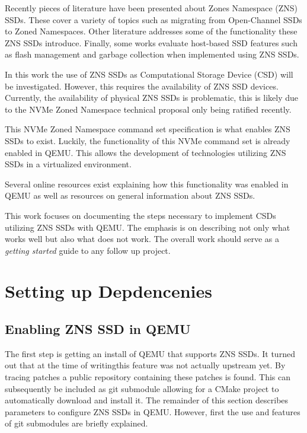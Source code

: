 \documentclass[conference]{IEEEtran}
\begin{document}
Recently pieces of literature have been presented about Zones Namespace (ZNS)
SSDs. These cover a variety of topics such as migrating from Open-Channel
SSDs to Zoned Namespaces\cite{bjorling2019open}. Other literature addresses
some of the  functionality these ZNS SSDs introduce\cite{bjorling2020zone}.
Finally, some works evaluate host-based SSD features such as flash management
and  garbage collection when implemented using ZNS SSDs\cite{254268,9188086}.

In this work the use of ZNS SSDs as Computational Storage Device (CSD) will be
investigated. However, this requires the availability of ZNS SSD devices.
Currently, the availability of physical ZNS SSDs is problematic, this is
likely  due to the NVMe Zoned Namespace technical proposal only being ratified
recently.

This NVMe Zoned Namespace command set specification is what enables ZNS SSDs to
exist\cite{nvme-zns}. Luckily, the functionality of this NVMe command set is
already enabled in QEMU. This allows the development of technologies utilizing
ZNS SSDs in a virtualized environment.

Several online resources exist explaining how this functionality was enabled in
QEMU\cite{nvme-qemu-1,nvme-qemu-2} as well as resources on general information
about ZNS SSDs\cite{zns-info}.

This work focuses on documenting the steps necessary to implement CSDs
utilizing ZNS SSDs with QEMU. The emphasis is on describing not only what works
well but  also what does not work. The overall work should serve as a
\textit{getting started} guide to any follow up project.

\section{Setting up Depdencenies}

\subsection{Enabling ZNS SSD in QEMU}

The first step is getting an install of QEMU that supports ZNS SSDs. It turned
out that at the time of writing\footnotemark[1] this feature was not actually
upstream yet. By tracing patches a public repository containing these patches
is found. This can subsequently be included as git submodule allowing for a
CMake project to automatically download and install it. The remainder of this
section describes parameters to configure ZNS SSDs in QEMU. However, first the
use and features of git submodules are briefly explained.
\end{document}
